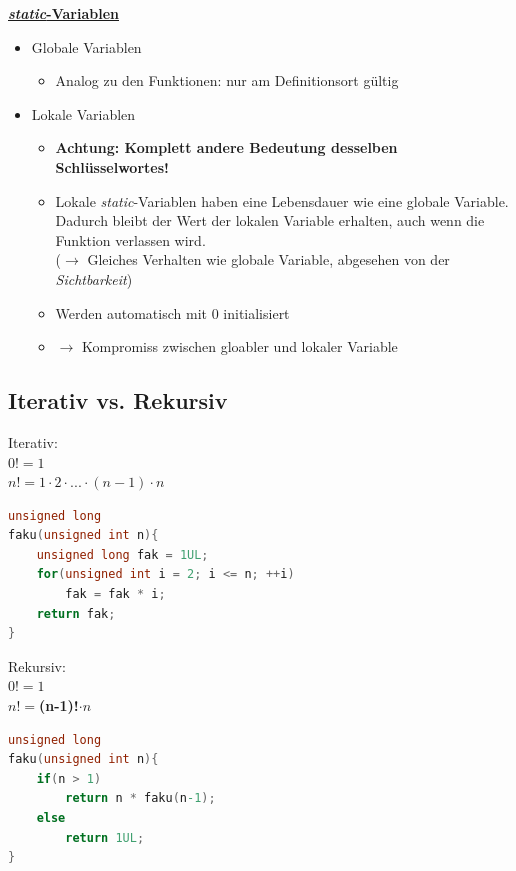 		\underline{\textbf{\textit{static}-Variablen}}
			\begin{itemize}
				\item Globale Variablen
				\begin{itemize}
					\item Analog zu den Funktionen: nur am Definitionsort gültig
				\end{itemize}
				\item Lokale Variablen
				\begin{itemize}
					\item \textbf{Achtung: Komplett andere Bedeutung desselben Schlüsselwortes!}
					\item Lokale \textit{static}-Variablen haben eine Lebensdauer wie eine globale Variable. Dadurch bleibt der Wert der lokalen Variable erhalten, auch wenn die Funktion verlassen wird.\\
					($\rightarrow$ Gleiches Verhalten wie globale Variable, abgesehen von der \textit{Sichtbarkeit})
					\item Werden automatisch mit 0 initialisiert
					\item $\rightarrow$ Kompromiss zwischen gloabler und lokaler Variable
				\end{itemize}
			\end{itemize}

	\subsection{Iterativ vs. Rekursiv}
		\begin{minipage}{0.49\linewidth}
			Iterativ:\\
			$0! = 1$ \\
			$n! = 1 \cdot 2 \cdot ... \cdot (n-1) \cdot n$
			\begin{lstlisting}[language=C]
unsigned long
faku(unsigned int n){
	unsigned long fak = 1UL;
	for(unsigned int i = 2; i <= n; ++i)
		fak = fak * i;
	return fak;
}
			\end{lstlisting}
		\end{minipage}
		\hfill
		\begin{minipage}{0.49\linewidth}
			Rekursiv:\\
			$0! = 1$ \\
			$n! = $\textbf{(n-1)!}$ \cdot n$
			\begin{lstlisting}[language=C]
unsigned long
faku(unsigned int n){
	if(n > 1)
		return n * faku(n-1);
	else
		return 1UL;
}
				\end{lstlisting}
		\end{minipage}
	

